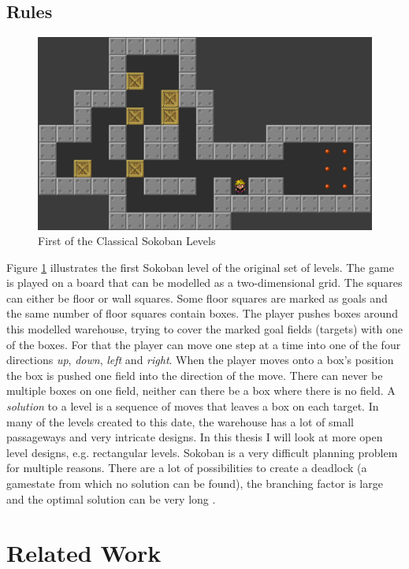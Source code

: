 \documentclass{report}
\begin{document}
\section{Rules}
\begin{figure}[ht]
\centering
\includegraphics[scale=0.2]{SokobanLevel1}
\caption{First of the Classical Sokoban Levels}
\label{fig:1}
\end{figure}
Figure \ref{fig:1} illustrates the first Sokoban level of the original set of levels. The game is played on a board that can be modelled as a two-dimensional grid. The squares can either be floor or wall squares. Some floor squares are marked as goals and the same number of floor squares contain boxes. The player pushes boxes around this modelled warehouse, trying to cover the marked goal fields (targets) with one of the boxes. For that the player can move one step at a time into one of the four directions \textit{up}, \textit{down}, \textit{left} and \textit{right}. When the player moves onto a box's position the box is pushed one field into the direction of the move. There can never be multiple boxes on one field, neither can there be a box where there is no field. A \textit{solution} to a level is a sequence of moves that leaves a box on each target.
In many of the levels created to this date, the warehouse has a lot of small passageways and very intricate designs. In this thesis I will look at more open level designs, e.g. rectangular levels.
Sokoban is a very difficult planning problem for multiple reasons. There are a lot of possibilities to create a deadlock (a gamestate from which no solution can be found), the branching factor is large and the optimal solution can be very long \cite{BoteaHeuristicsVsPlanning}.
\chapter{Related Work}
\end{document}
